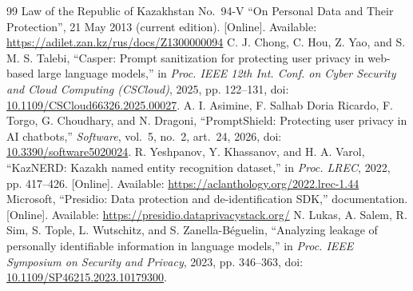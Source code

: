 \documentclass[12pt,a4paper]{article}
\newcommand{\doi}[1]{doi: \href{https://doi.org/#1}{#1}}
\begin{document}
\begin{thebibliography}{99}
 Law of the Republic of Kazakhstan No.~94-V ``On Personal Data and Their Protection'', 21 May 2013 (current edition). [Online]. Available: \url{https://adilet.zan.kz/rus/docs/Z1300000094}
 C. J. Chong, C. Hou, Z. Yao, and S. M. S. Talebi, ``Casper: Prompt sanitization for protecting user privacy in web-based large language models,'' in \emph{Proc. IEEE 12th Int. Conf. on Cyber Security and Cloud Computing (CSCloud)}, 2025, pp. 122--131, \doi{10.1109/CSCloud66326.2025.00027}.
 A. I. Asimine, F. Salhab Doria Ricardo, F. Torgo, G. Choudhary, and N. Dragoni, ``PromptShield: Protecting user privacy in AI chatbots,'' \emph{Software}, vol.~5, no.~2, art.~24, 2026, \doi{10.3390/software5020024}.
 R. Yeshpanov, Y. Khassanov, and H. A. Varol, ``KazNERD: Kazakh named entity recognition dataset,'' in \emph{Proc. LREC}, 2022, pp. 417--426. [Online]. Available: \url{https://aclanthology.org/2022.lrec-1.44}
 Microsoft, ``Presidio: Data protection and de-identification SDK,'' documentation. [Online]. Available: \url{https://presidio.dataprivacystack.org/}
 N. Lukas, A. Salem, R. Sim, S. Tople, L. Wutschitz, and S. Zanella-Béguelin, ``Analyzing leakage of personally identifiable information in language models,'' in \emph{Proc. IEEE Symposium on Security and Privacy}, 2023, pp. 346--363, \doi{10.1109/SP46215.2023.10179300}.
\end{thebibliography}
\end{document}

